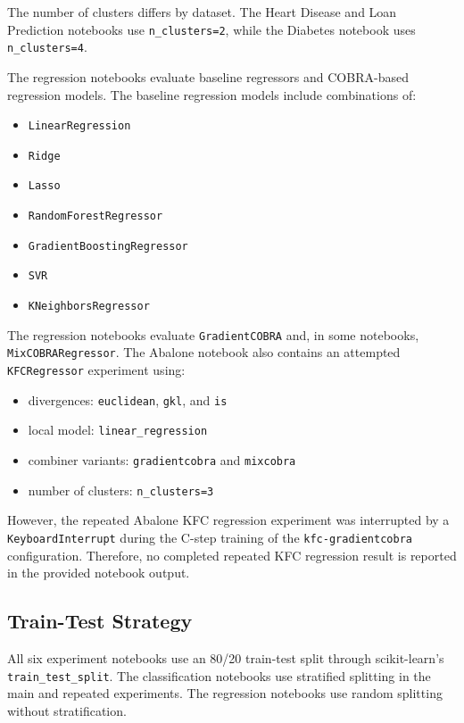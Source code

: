 The number of clusters differs by dataset. The Heart Disease and Loan Prediction notebooks use \texttt{n\_clusters=2}, while the Diabetes notebook uses \texttt{n\_clusters=4}.

The regression notebooks evaluate baseline regressors and COBRA-based regression models. The baseline regression models include combinations of:

\begin{itemize}
    \item \texttt{LinearRegression}
    \item \texttt{Ridge}
    \item \texttt{Lasso}
    \item \texttt{RandomForestRegressor}
    \item \texttt{GradientBoostingRegressor}
    \item \texttt{SVR}
    \item \texttt{KNeighborsRegressor}
\end{itemize}

The regression notebooks evaluate \texttt{GradientCOBRA} and, in some notebooks, \texttt{MixCOBRARegressor}. The Abalone notebook also contains an attempted \texttt{KFCRegressor} experiment using:

\begin{itemize}
    \item divergences: \texttt{euclidean}, \texttt{gkl}, and \texttt{is}
    \item local model: \texttt{linear\_regression}
    \item combiner variants: \texttt{gradientcobra} and \texttt{mixcobra}
    \item number of clusters: \texttt{n\_clusters=3}
\end{itemize}

However, the repeated Abalone KFC regression experiment was interrupted by a \texttt{KeyboardInterrupt} during the C-step training of the \texttt{kfc-gradientcobra} configuration. Therefore, no completed repeated KFC regression result is reported in the provided notebook output.

\subsection{Train-Test Strategy}

All six experiment notebooks use an 80/20 train-test split through scikit-learn's \texttt{train\_test\_split}. The classification notebooks use stratified splitting in the main and repeated experiments. The regression notebooks use random splitting without stratification.

